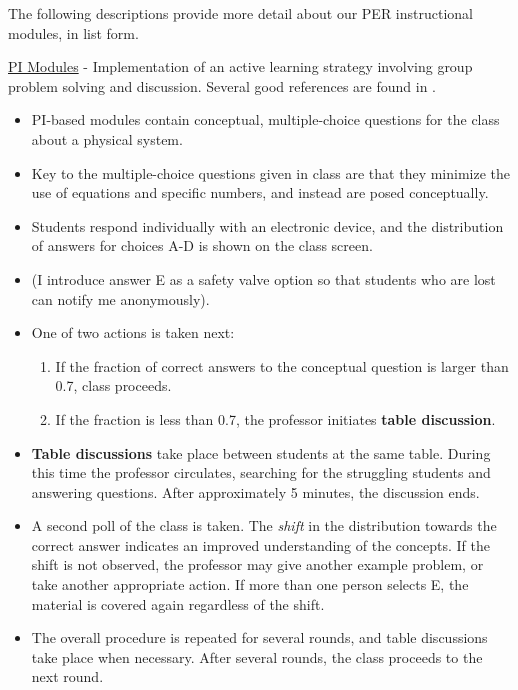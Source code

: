\documentclass[../../../main.tex]{subfiles}
\begin{document}
The following descriptions provide more detail about our PER instructional modules, in list form.

\underline{PI Modules} - Implementation of an active learning strategy involving group problem solving and discussion.  Several good references are found in \cite{mazur2013peer} \cite{AAPTPI} \cite{PhysPort}.
\begin{itemize}
\item PI-based modules contain conceptual, multiple-choice questions for the class about a physical system.
\item Key to the multiple-choice questions given in class are that they minimize the use of equations and specific numbers, and instead are posed conceptually.
\item Students respond individually with an electronic device, and the distribution of answers for choices A-D is shown on the class screen.
\item (I introduce answer E as a safety valve option so that students who are lost can notify me anonymously).
\item One of two actions is taken next:
\begin{enumerate}
\item If the fraction of correct answers to the conceptual question is larger than 0.7, class proceeds.
\item If the fraction is less than 0.7, the professor initiates \textbf{table discussion}.
\end{enumerate}
\item \textbf{Table discussions} take place between students at the same table.  During this time the professor circulates, searching for the struggling students and answering questions.  After approximately 5 minutes, the discussion ends.
\item A second poll of the class is taken.  The \textit{shift} in the distribution towards the correct answer indicates an improved understanding of the concepts.  If the shift is not observed, the professor may give another example problem, or take another appropriate action.  If more than one person selects E, the material is covered again regardless of the shift.
\item The overall procedure is repeated for several rounds, and table discussions take place when necessary.  After several rounds, the class proceeds to the next round.
\end{itemize}
\end{document}
